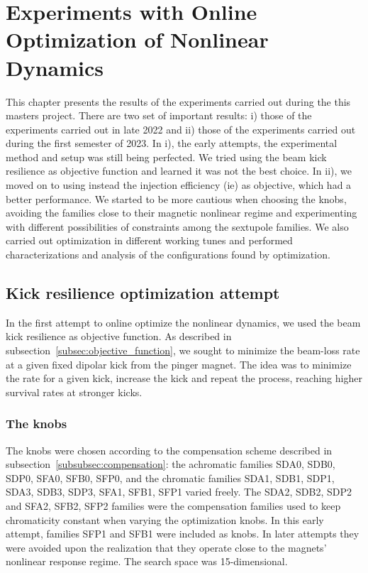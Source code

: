 \chapter{Experiments with Online Optimization of Nonlinear Dynamics}
This chapter presents the results of the experiments carried out during the this masters project. There are two set of important results: i) those of the experiments carried out in late 2022 and ii) those of the experiments carried out during the first semester of 2023. In i), the early attempts, the experimental method and setup was still being perfected. We tried using the beam kick resilience as objective function and learned it was not the best choice. In ii), we moved on to using instead the injection efficiency (\gls*{ie}) as objective, which had a better performance.  We started to be more cautious when choosing the knobs, avoiding the families close to their magnetic nonlinear regime and experimenting with different possibilities of constraints among the sextupole families. We also carried out optimization in different working tunes and performed  characterizations and analysis of the configurations found by optimization.
\section{Kick resilience optimization attempt}
\label{sec:kick_res_opt}
In the first attempt to online optimize the nonlinear dynamics, we used the beam kick resilience as objective function. As described in subsection~\ref{subsec:objective_function}, we sought to minimize the beam-loss rate at a given fixed dipolar kick from the pinger magnet. The idea was to minimize the rate for a given kick, increase the kick and repeat the process, reaching higher survival rates at stronger kicks.
\subsection{The knobs}
The knobs were chosen according to the compensation scheme described in subsection~\ref{subsubsec:compensation}: the achromatic families SDA0, SDB0, SDP0, SFA0, SFB0, SFP0, and the chromatic families SDA1, SDB1, SDP1, SDA3, SDB3, SDP3, SFA1, SFB1, SFP1 varied freely. The SDA2, SDB2, SDP2 and SFA2, SFB2, SFP2 families were the compensation families used to keep chromaticity constant when varying the optimization knobs. In this early attempt, families SFP1 and SFB1 were included as knobs. In later attempts they were avoided upon the realization that they operate close to the magnets' nonlinear response regime. The search space was 15-dimensional.
